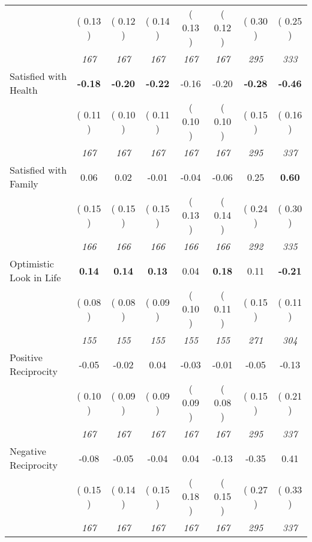 \begin{tabular}{l c c c c c c c}
& (     0.13 ) & (     0.12 ) & (     0.14 ) & (     0.13 ) & (     0.12 ) & (     0.30 ) & (     0.25 ) \\
& \textit{ 167 } & \textit{ 167 } & \textit{ 167 } & \textit{ 167 } & \textit{ 167 } & \textit{ 295 } & \textit{ 333 } \\
Satisfied with Health & \textbf{     -0.18 } & \textbf{     -0.20 } & \textbf{     -0.22 } &     -0.16 &     -0.20 & \textbf{     -0.28 } & \textbf{     -0.46 } \\
& (     0.11 ) & (     0.10 ) & (     0.11 ) & (     0.10 ) & (     0.10 ) & (     0.15 ) & (     0.16 ) \\
& \textit{ 167 } & \textit{ 167 } & \textit{ 167 } & \textit{ 167 } & \textit{ 167 } & \textit{ 295 } & \textit{ 337 } \\
Satisfied with Family &      0.06 &      0.02 &     -0.01 &     -0.04 &     -0.06 &      0.25 & \textbf{      0.60 } \\
& (     0.15 ) & (     0.15 ) & (     0.15 ) & (     0.13 ) & (     0.14 ) & (     0.24 ) & (     0.30 ) \\
& \textit{ 166 } & \textit{ 166 } & \textit{ 166 } & \textit{ 166 } & \textit{ 166 } & \textit{ 292 } & \textit{ 335 } \\
Optimistic Look in Life & \textbf{      0.14 } & \textbf{      0.14 } & \textbf{      0.13 } &      0.04 & \textbf{     0.18} &      0.11 & \textbf{     -0.21 } \\
& (     0.08 ) & (     0.08 ) & (     0.09 ) & (     0.10 ) & (     0.11 ) & (     0.15 ) & (     0.11 ) \\
& \textit{ 155 } & \textit{ 155 } & \textit{ 155 } & \textit{ 155 } & \textit{ 155 } & \textit{ 271 } & \textit{ 304 } \\
Positive Reciprocity &     -0.05 &     -0.02 &      0.04 &     -0.03 &     -0.01 &     -0.05 &     -0.13 \\
& (     0.10 ) & (     0.09 ) & (     0.09 ) & (     0.09 ) & (     0.08 ) & (     0.15 ) & (     0.21 ) \\
& \textit{ 167 } & \textit{ 167 } & \textit{ 167 } & \textit{ 167 } & \textit{ 167 } & \textit{ 295 } & \textit{ 337 } \\
Negative Reciprocity &     -0.08 &     -0.05 &     -0.04 &      0.04 &     -0.13 &     -0.35 &      0.41 \\
& (     0.15 ) & (     0.14 ) & (     0.15 ) & (     0.18 ) & (     0.15 ) & (     0.27 ) & (     0.33 ) \\
& \textit{ 167 } & \textit{ 167 } & \textit{ 167 } & \textit{ 167 } & \textit{ 167 } & \textit{ 295 } & \textit{ 337 } \\
\bottomrule
\end{tabular}
